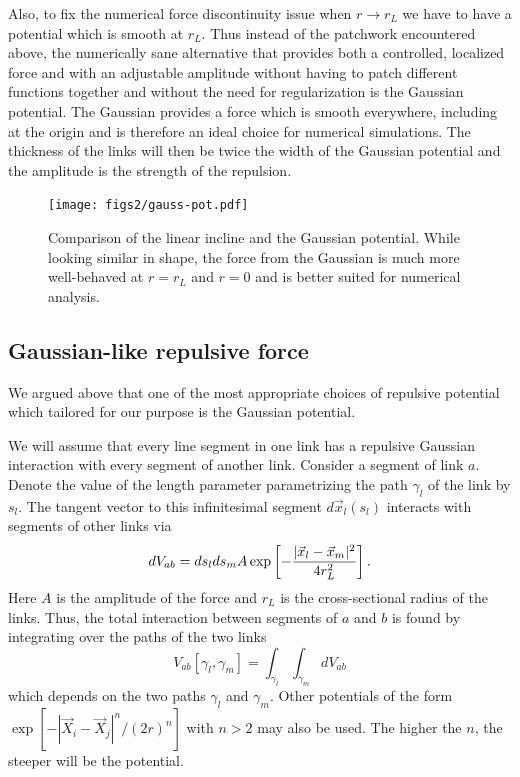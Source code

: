 \documentclass[nofootinbib,preprint,floatfix,titlepage,endfloats,superscriptaddress]{revtex4} %
\begin{document}
Also, to fix the numerical force discontinuity issue when $r\to r_L$ we have to have a potential which is smooth at $r_L$. Thus instead of the patchwork encountered above, the numerically  sane 
alternative that provides both a controlled, localized force and with an adjustable amplitude without having to patch different functions together and without the need for regularization is the Gaussian potential. 
The Gaussian provides a force which is smooth everywhere, including at the origin and is therefore an ideal choice for numerical simulations. 
The thickness of the links will then be twice the width of the Gaussian potential and the amplitude is the strength of the repulsion.  

\begin{figure}
    \centering
    \texttt{[image: figs2/gauss-pot.pdf]}
    \caption{Comparison of the linear incline and the Gaussian potential. While looking similar in shape, the force from the Gaussian is much more well-behaved at $r= r_L$ and $r=0$ and is better suited for numerical analysis. }
    \label{fig:gauss}
\end{figure}

\subsection{Gaussian-like repulsive force}
We argued above
that one of the most appropriate choices of repulsive potential which tailored for our purpose is the Gaussian potential. 

We will assume that every line segment in one link has a repulsive Gaussian interaction with every segment of another link. Consider a segment of link $a$. Denote the value of the length parameter parametrizing the path $\gamma_l$ of the link by $s_l$. The tangent vector to this infinitesimal segment $d\vec{x}_l(s_l)$ interacts with segments of other links via
\begin{equation}
dV_{ab} = %
ds_lds_m
A \exp\left[- {|\vec{x}_l-\vec{x}_m|^2 \over 4 r_L^2}\right]\label{eq:dVij}.
\end{equation}
Here $A$ is the amplitude of the force and $r_L$ is the cross-sectional radius of the links.
Thus, the total interaction between segments of $a$ and $b$ is found by integrating over the paths of the two links
\begin{equation}
V_{ab}[\gamma_l,\gamma_m] = \int_{\gamma_l} \int_{\gamma_m} dV_{ab} \label{eq:Vij}
\end{equation}
which depends on the two paths $\gamma_l$ and $\gamma_m$.  
Other potentials of the form $\exp[-|\vec{X}_i-\vec{X}_j|^n/(2r)^n]$ with $n>2$ may also be used. The higher the $n$, the steeper will be the potential.
\end{document}
